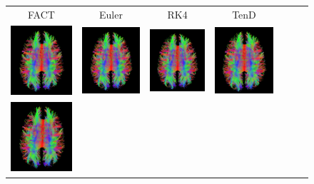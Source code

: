 \documentclass{frontiersSCNS} %
\begin{document}
\begin{figure}
\begin{center}
\renewcommand{\tabcolsep}{0pt}
\renewcommand\arraystretch{0}
\begin{tabular}{ccccccc}
FACT & Euler & RK4 & TenD \\
\includegraphics[width=0.25\linewidth]{figures/113_30_fact.png} & 
\includegraphics[width=0.25\linewidth]{figures/113_30_euler.png} & 
\includegraphics[width=0.25\linewidth]{figures/113_30_rk4.png} & 
\includegraphics[width=0.25\linewidth]{figures/113_30_tend.png} \\
\includegraphics[width=0.25\linewidth]{figures/113_33_fact.png} & 

\end{tabular}
\end{center}
\end{figure}
\end{document}
